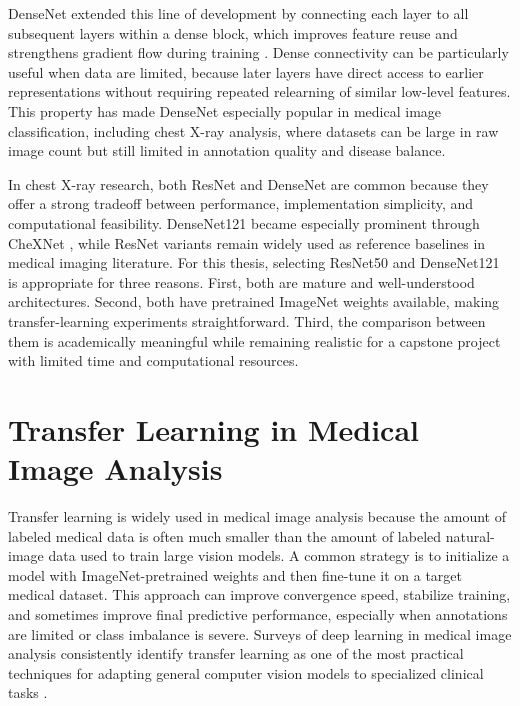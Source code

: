 DenseNet extended this line of development by connecting each layer to all subsequent layers within a dense block, which improves feature reuse and strengthens gradient flow during training \cite{ref:huang2017}. Dense connectivity can be particularly useful when data are limited, because later layers have direct access to earlier representations without requiring repeated relearning of similar low-level features. This property has made DenseNet especially popular in medical image classification, including chest X-ray analysis, where datasets can be large in raw image count but still limited in annotation quality and disease balance.

In chest X-ray research, both ResNet and DenseNet are common because they offer a strong tradeoff between performance, implementation simplicity, and computational feasibility. DenseNet121 became especially prominent through CheXNet \cite{ref:rajpurkar2017}, while ResNet variants remain widely used as reference baselines in medical imaging literature. For this thesis, selecting ResNet50 and DenseNet121 is appropriate for three reasons. First, both are mature and well-understood architectures. Second, both have pretrained ImageNet weights available, making transfer-learning experiments straightforward. Third, the comparison between them is academically meaningful while remaining realistic for a capstone project with limited time and computational resources.

\section{Transfer Learning in Medical Image Analysis}
Transfer learning is widely used in medical image analysis because the amount of labeled medical data is often much smaller than the amount of labeled natural-image data used to train large vision models. A common strategy is to initialize a model with ImageNet-pretrained weights and then fine-tune it on a target medical dataset. This approach can improve convergence speed, stabilize training, and sometimes improve final predictive performance, especially when annotations are limited or class imbalance is severe. Surveys of deep learning in medical image analysis consistently identify transfer learning as one of the most practical techniques for adapting general computer vision models to specialized clinical tasks \cite{ref:litjens2017}.

